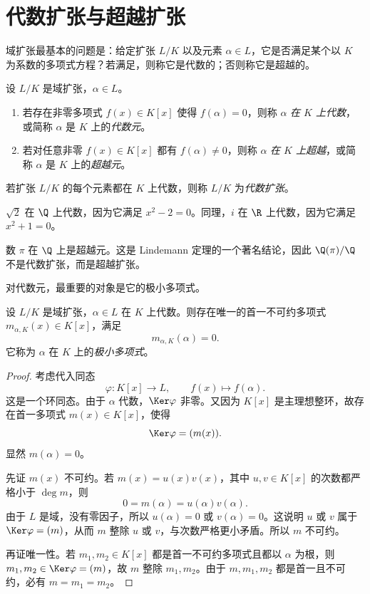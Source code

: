 \section{代数扩张与超越扩张}

域扩张最基本的问题是：给定扩张 $L/K$ 以及元素 $\alpha\in L$，它是否满足某个以 $K$ 为系数的多项式方程？若满足，则称它是代数的；否则称它是超越的。

\begin{definition}
设 $L/K$ 是域扩张，$\alpha\in L$。
\begin{enumerate}[label=(\arabic*)]
  \item 若存在非零多项式 $f(x)\in K[x]$ 使得 $f(\alpha)=0$，则称 $\alpha$ \emph{在 $K$ 上代数}，或简称 $\alpha$ 是 $K$ 上的\emph{代数元}。
  \item 若对任意非零 $f(x)\in K[x]$ 都有 $f(\alpha)\ne 0$，则称 $\alpha$ \emph{在 $K$ 上超越}，或简称 $\alpha$ 是 $K$ 上的\emph{超越元}。
\end{enumerate}
若扩张 $L/K$ 的每个元素都在 $K$ 上代数，则称 $L/K$ 为\emph{代数扩张}。
\end{definition}

\begin{example}
$\sqrt2$ 在 $\Q$ 上代数，因为它满足 $x^2-2=0$。同理，$i$ 在 $\R$ 上代数，因为它满足 $x^2+1=0$。
\end{example}

\begin{example}
数 $\pi$ 在 $\Q$ 上是超越元。这是 Lindemann 定理的一个著名结论，因此 $\Q(\pi)/\Q$ 不是代数扩张，而是超越扩张。
\end{example}

对代数元，最重要的对象是它的极小多项式。

\begin{theorem}[极小多项式]
设 $L/K$ 是域扩张，$\alpha\in L$ 在 $K$ 上代数。则存在唯一的首一不可约多项式 $m_{\alpha,K}(x)\in K[x]$，满足
\[
m_{\alpha,K}(\alpha)=0.
\]
它称为 $\alpha$ 在 $K$ 上的\emph{极小多项式}。
\end{theorem}

\begin{proof}
考虑代入同态
\[
\varphi:K[x]\longrightarrow L,\qquad f(x)\longmapsto f(\alpha).
\]
这是一个环同态。由于 $\alpha$ 代数，$\Ker\varphi$ 非零。又因为 $K[x]$ 是主理想整环，故存在首一多项式 $m(x)\in K[x]$，使得
\[
\Ker\varphi=(m(x)).
\]
显然 $m(\alpha)=0$。

先证 $m(x)$ 不可约。若 $m(x)=u(x)v(x)$，其中 $u,v\in K[x]$ 的次数都严格小于 $\deg m$，则
\[
0=m(\alpha)=u(\alpha)v(\alpha).
\]
由于 $L$ 是域，没有零因子，所以 $u(\alpha)=0$ 或 $v(\alpha)=0$。这说明 $u$ 或 $v$ 属于 $\Ker\varphi=(m)$，从而 $m$ 整除 $u$ 或 $v$，与次数严格更小矛盾。所以 $m$ 不可约。

再证唯一性。若 $m_1,m_2\in K[x]$ 都是首一不可约多项式且都以 $\alpha$ 为根，则 $m_1,m_2\in\Ker\varphi=(m)$，故 $m$ 整除 $m_1,m_2$。由于 $m,m_1,m_2$ 都是首一且不可约，必有 $m=m_1=m_2$。
\end{proof}

